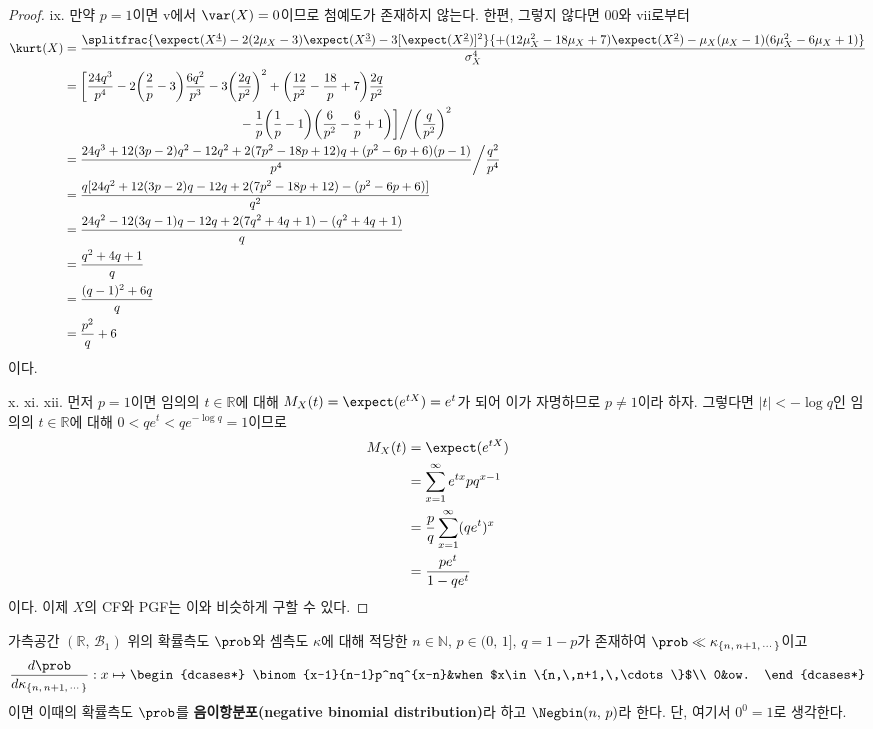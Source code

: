 \begin{proof}
    ix. 만약 $p=1$이면 v에서 $\var(X)=0$이므로 첨예도가 존재하지 않는다. 한편, 그렇지 않다면 00와 vii로부터
    \begin{align*}
        \kurt(X)&=\frac{\splitfrac{\expect(X^{\underline{4}})-2(2\mu_X-3)\expect(X^{\underline{3}})-3[\expect(X^{\underline{2}})]^2}{+(12\mu_X^2-18\mu_X+7)\expect(X^{\underline{2}})-\mu_X(\mu_X-1)(6\mu_X^2-6\mu_X+1)}}{\sigma_X^4}\\
        &=\bigg[\frac{24q^3}{p^4}-2\bigg(\frac{2}{p}-3\bigg)\frac{6q^2}{p^3}-3\bigg(\frac{2q}{p^2}\bigg)^2+\bigg(\frac{12}{p^2}-\frac{18}{p}+7\bigg)\frac{2q}{p^2}\\
        &\qquad\qquad\qquad\qquad\qquad\qquad\qquad-\frac{1}{p}\bigg(\frac{1}{p}-1\bigg)\bigg(\frac{6}{p^2}-\frac{6}{p}+1\bigg)\bigg]\bigg/\bigg(\frac{q}{p^2}\bigg)^2\\
        &=\frac{24q^3+12(3p-2)q^2-12q^2+2(7p^2-18p+12)q+(p^2-6p+6)(p-1)}{p^4}\bigg/\frac{q^2}{p^4}\\
        &=\frac{q[24q^2+12(3p-2)q-12q+2(7p^2-18p+12)-(p^2-6p+6)]}{q^2}\\
        &=\frac{24q^2-12(3q-1)q-12q+2(7q^2+4q+1)-(q^2+4q+1)}{q}\\
        &=\frac{q^2+4q+1}{q}\\
        &=\frac{(q-1)^2+6q}{q}\\
        &=\frac{p^2}{q}+6
    \end{align*}
    이다.

    x. xi. xii. 먼저 $p=1$이면 임의의 $t\in\mathbb{R}$에 대해 $M_X(t)=\expect(e^{tX})=e^t$가 되어 이가 자명하므로 $p\ne1$이라 하자. 그렇다면 $|t|<-\log q$인 임의의 $t\in\mathbb{R}$에 대해 $0<qe^t<qe^{-\log q}=1$이므로
    \begin{align*}
        M_X(t)&=\expect(e^{tX})\\
        &=\sum_{x=1}^\infty e^{tx}pq^{x-1}\\
        &=\frac{p}{q}\sum_{x=1}^\infty(qe^t)^x\\
        &=\frac{pe^t}{1-qe^t}
    \end{align*}
    이다. 이제 $X$의 CF와 PGF는 이와 비슷하게 구할 수 있다.
\end{proof}

\begin{definition}
    가측공간 $(\mathbb{R},\,\mathcal{B}_1)$ 위의 확률측도 $\prob$와 셈측도 $\kappa$에 대해 적당한 $n\in\mathbb{N},\,p\in(0,\,1],\,q=1-p$가 존재하여 $\prob\ll\kappa_{\{n,\,n+1,\,\cdots\}}$이고
    \begin{equation*}
        \frac{d\prob}{d\kappa_{\{n,\,n+1,\,\cdots\}}}:x\mapsto
        \begin{dcases*}
            \binom{x-1}{n-1}p^nq^{x-n}&when $x\in\{n,\,n+1,\,\cdots\}$\\
            0&ow.
        \end{dcases*}
    \end{equation*}
    이면 이때의 확률측도 $\prob$를 \textbf{음이항분포(negative binomial distribution)}라 하고 $\Negbin(n,\,p)$라 한다. 단, 여기서 $0^0=1$로 생각한다.
\end{definition}

